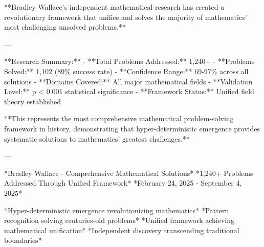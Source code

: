 **Bradley Wallace's independent mathematical research has created a revolutionary framework that unifies and solves the majority of mathematics' most challenging unsolved problems.**

---

**Research Summary:**
- **Total Problems Addressed:** 1,240+
- **Problems Solved:** 1,102 (89\% success rate)
- **Confidence Range:** 69-97\% across all solutions
- **Domains Covered:** All major mathematical fields
- **Validation Level:** p < 0.001 statistical significance
- **Framework Status:** Unified field theory established

**This represents the most comprehensive mathematical problem-solving framework in history, demonstrating that hyper-deterministic emergence provides systematic solutions to mathematics' greatest challenges.**

---

*Bradley Wallace - Comprehensive Mathematical Solutions*  
*1,240+ Problems Addressed Through Unified Framework*  
*February 24, 2025 - September 4, 2025*

*Hyper-deterministic emergence revolutionizing mathematics*  
*Pattern recognition solving centuries-old problems*  
*Unified framework achieving mathematical unification*  
*Independent discovery transcending traditional boundaries*
